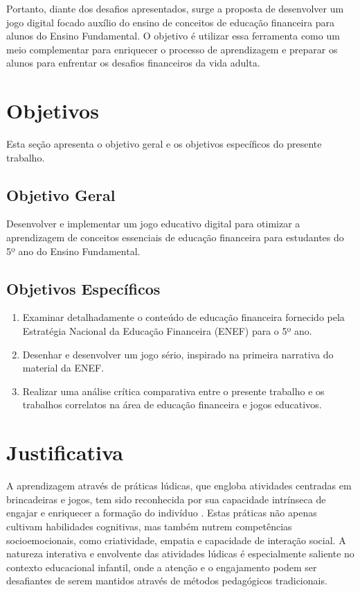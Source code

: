 Portanto, diante dos desafios apresentados, surge a proposta de desenvolver um jogo digital focado auxílio do ensino de conceitos de educação financeira para alunos do Ensino Fundamental. O objetivo é utilizar essa ferramenta como um meio complementar para enriquecer o processo de aprendizagem e preparar os alunos para enfrentar os desafios financeiros da vida adulta.

\section{Objetivos}
Esta seção apresenta o objetivo geral e os objetivos específicos do presente trabalho.

\subsection{Objetivo Geral}
Desenvolver e implementar um jogo educativo digital para otimizar a aprendizagem de conceitos essenciais de educação financeira para estudantes do 5º ano do Ensino Fundamental.

\subsection{Objetivos Específicos}
\begin{enumerate}[noitemsep,nosep,labelindent=\parindent,leftmargin=*,label={\alph*}) ]
	\item Examinar detalhadamente o conteúdo de educação financeira fornecido pela Estratégia Nacional da Educação Financeira (ENEF) para o 5º ano.
	\item Desenhar e desenvolver um jogo sério, inspirado na primeira narrativa do material da ENEF.
	\item Realizar uma análise crítica comparativa entre o presente trabalho e os trabalhos correlatos na área de educação financeira e jogos educativos.
\end{enumerate}

\section{Justificativa}

A aprendizagem através de práticas lúdicas, que engloba atividades centradas em brincadeiras e jogos, tem sido reconhecida por sua capacidade intrínseca de engajar e enriquecer a formação do indivíduo \cite{Santos_Thayna_da_silva_2021}. Estas práticas não apenas cultivam habilidades cognitivas, mas também nutrem competências socioemocionais, como criatividade, empatia e capacidade de interação social. A natureza interativa e envolvente das atividades lúdicas é especialmente saliente no contexto educacional infantil, onde a atenção e o engajamento podem ser desafiantes de serem mantidos através de métodos pedagógicos tradicionais.

